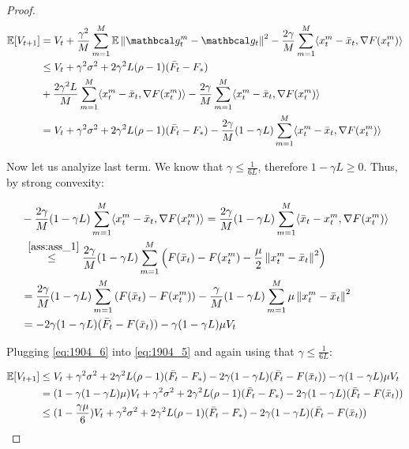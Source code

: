 \begin{proof}
    \begin{align}
        \E [V_{t+1}] 
        &=
        V_t + \frac{\gamma^2}{M} \summ{m=1}{M} \E \norm{\mc{g}^m_t - \mc{g}_t}^2 - \frac{2\gamma}{M} \summ{m=1}{M} \inner{x^m_t - \bar{x}_t}{\nabla F(x^m_t)} \\
        &\leq 
        V_t 
        +\gamma^2 \sigma^2 
        +2 \gamma^2 L (\rho - 1) (\bar{F}_t - F_*) \\
        &+\frac{2 \gamma^2 L}{M} \summ{m=1}{M} \inner{x^m_t - \bar{x}_t}{\nabla F(x^m_t)}
        - \frac{2\gamma}{M} \summ{m=1}{M} \inner{x^m_t - \bar{x}_t}{\nabla F(x^m_t)} \\
        &=
        V_t 
        +\gamma^2 \sigma^2 
        +2 \gamma^2 L (\rho - 1) (\bar{F}_t - F_*)
        - \frac{2\gamma}{M}(1 - \gamma L) \summ{m=1}{M} \inner{x^m_t - \bar{x}_t}{\nabla F(x^m_t)}
        \label{eq:1904_5}
    \end{align}

    Now let us analyize last term. We know that $\gamma \leq \frac{1}{6L}$, therefore $1 - \gamma L \geq 0$. Thus, by strong convexity:

    \begin{align}
    &- \frac{2\gamma}{M}(1 - \gamma L) \summ{m=1}{M} \inner{x^m_t - \bar{x}_t}{\nabla F(x^m_t)} 
    =
    \frac{2\gamma}{M}(1 - \gamma L) \summ{m=1}{M} \inner{\bar{x}_t - x^m_t}{\nabla F(x^m_t)} \\
    &\overset{~\ref{ass:ass_1}}{\leq}
    \frac{2\gamma}{M}(1 - \gamma L) \summ{m=1}{M} \left(F(\bar{x}_t) - F(x^m_t) - \frac{\mu}{2} \norm{x^m_t - \bar{x}_t}^2 \right) \\
    &=
    \frac{2\gamma}{M}(1 - \gamma L) \summ{m=1}{M} \left( F(\bar{x}_t) - F(x^m_t) \right)
    - \frac{\gamma}{M}(1 - \gamma L) \summ{m=1}{M} \mu \norm{x^m_t - \bar{x}_t}^2 \\
    &=
    - 2\gamma (1-\gamma L) (\bar{F}_t - F(\bar{x}_t)) - \gamma (1 - \gamma L) \mu V_t
    \label{eq:1904_6}
    \end{align}

    Plugging \eqref{eq:1904_6} into \eqref{eq:1904_5} and again using that $\gamma \leq \frac{1}{6L}$:

    \begin{align}
        \E [V_{t+1}]
        &\leq
        V_t 
        + \gamma^2 \sigma^2 
        + 2 \gamma^2 L (\rho - 1) (\bar{F}_t - F_*)
        - 2\gamma (1-\gamma L) (\bar{F}_t - F(\bar{x}_t)) - \gamma (1 - \gamma L) \mu V_t \\
        &=
        (1 - \gamma (1 - \gamma L) \mu) V_t
        + \gamma^2 \sigma^2 
        + 2 \gamma^2 L (\rho - 1) (\bar{F}_t - F_*)
        - 2\gamma (1-\gamma L) (\bar{F}_t - F(\bar{x}_t)) \\
        &\leq
        (1 - \frac {\gamma \mu}{6}) V_t
        + \gamma^2 \sigma^2 
        + 2 \gamma^2 L (\rho - 1) (\bar{F}_t - F_*)
        - 2\gamma (1-\gamma L) (\bar{F}_t - F(\bar{x}_t))
        \label{eq:1904_7} 
    \end{align}


\end{proof}

